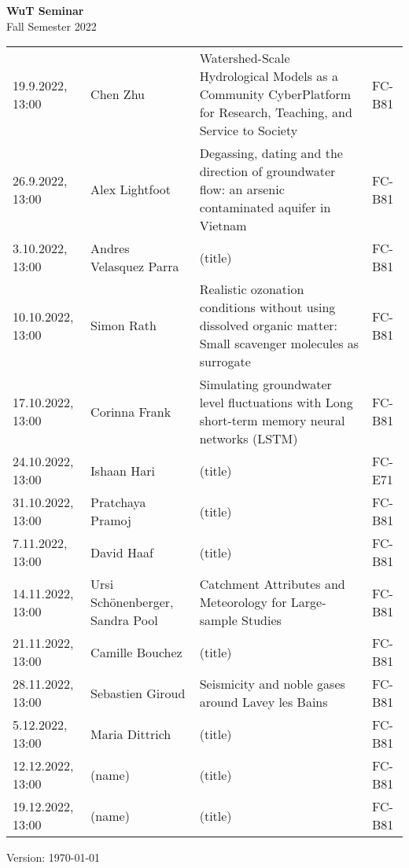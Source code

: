 \documentclass[12pt]{article}
\begin{document}
\centering

{\Huge \bf WuT Seminar}\\[1cm]
{\Large Fall Semester 2022}\\[1.8cm]





\renewcommand*\arraystretch{1.4}
\begin{tabular}{l p{3.8cm} p{8.5cm} p{2cm}}

19.9.2022, 13:00
 	& Chen Zhu
 	& Watershed-Scale Hydrological Models as a Community CyberPlatform for Research, Teaching, and Service to Society
  & FC-B81\\
  
26.9.2022, 13:00
 	& Alex Lightfoot
 	& Degassing, dating and the direction of groundwater flow: an arsenic contaminated aquifer in Vietnam
 	& FC-B81\\

3.10.2022, 13:00
 	& Andres Velasquez Parra
 	& (title)
 	& FC-B81\\

10.10.2022, 13:00
 	& Simon Rath
 	& Realistic ozonation conditions without using dissolved organic matter: Small scavenger molecules as surrogate
 	& FC-B81\\

17.10.2022, 13:00
 	& Corinna Frank
 	& Simulating groundwater level fluctuations with Long short-term memory neural networks (LSTM)
 	& FC-B81\\
 	
24.10.2022, 13:00
 	& Ishaan Hari
 	& (title)
 	& FC-E71\\

31.10.2022, 13:00
 	& Pratchaya Pramoj
 	& (title)
 	& FC-B81\\

7.11.2022, 13:00
 	& David Haaf
 	& (title)
 	& FC-B81\\

14.11.2022, 13:00
 	& Ursi Schönenberger, Sandra Pool
 	& Catchment Attributes and Meteorology for Large-sample Studies
 	& FC-B81\\

21.11.2022, 13:00
 	& Camille Bouchez
 	& (title)
 	& FC-B81\\

28.11.2022, 13:00
 	& Sebastien Giroud
 	& Seismicity and noble gases around Lavey les Bains
 	& FC-B81\\

5.12.2022, 13:00
 	& Maria Dittrich
 	& (title)
 	& FC-B81\\

12.12.2022, 13:00
 	& (name)
 	& (title)
 	& FC-B81\\

19.12.2022, 13:00
 	& (name)
 	& (title)
 	& FC-B81\\


\end{tabular}

\vfill

{\scriptsize Version: \today}
\end{document}
